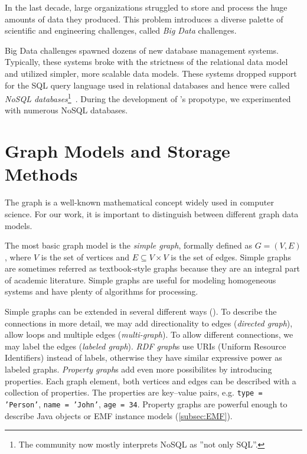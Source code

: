 In the last decade, large organizations struggled to store and process the huge amounts of data they produced. This problem introduces a diverse palette of scientific and engineering challenges, called \emph{Big Data} challenges. 

Big Data challenges spawned dozens of new database management systems. Typically, these systems broke with the strictness of the relational data model and utilized simpler, more scalable data models. These systems dropped support for the SQL query language used in relational databases and hence were called \emph{NoSQL databases}\footnote{The community now mostly interprets NoSQL as ''not only SQL''.}~\cite{NoSQL}. During the development of \iqd's propotype, we experimented with numerous NoSQL databases.

\section{Graph Models and Storage Methods}

The graph is a well-known mathematical concept widely used in computer science. For our work, it is important to distinguish between different graph data models.


The most basic graph model is the \emph{simple graph}, formally defined as $G = (V, E)$, where $V$ is the set of vertices and $E \subseteq V \times V$ is the set of edges. Simple graphs are sometimes referred as textbook-style graphs because they are an integral part of academic literature. Simple graphs are useful for modeling homogeneous systems and have plenty of algorithms for processing.

Simple graphs can be extended in several different ways (). To describe the connections in more detail, we may add directionality to edges (\emph{directed graph}), allow loops and multiple edges (\emph{multi-graph}). To allow different connections, we may label the edges (\emph{labeled graph}). \emph{RDF graph}s use URIs (Uniform Resource Identifiers) instead of labels, otherwise they have similar expressive power as labeled graphs. \emph{Property graph}s add even more possibilites by introducing properties. Each graph element, both vertices and edges can be described with a collection of properties. The properties are key--value pairs, e.g. \texttt{type = 'Person'}, \texttt{name = 'John'}, \texttt{age = 34}. 
Property graphs are powerful enough to describe Java objects or EMF instance models (\autoref{subsec:EMF}). 

